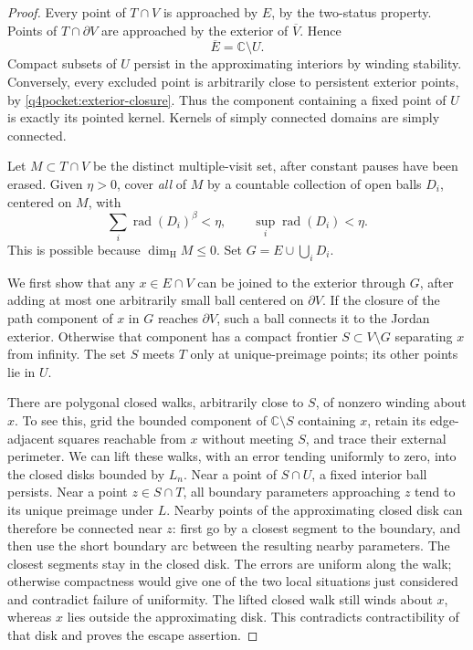 \begin{proof}
Every point of $T\cap V$ is approached by $E$, by the two-status
property.  Points of $T\cap\partial V$ are approached by the exterior
of $\overline V$.  Hence
\begin{equation}
 \overline E=\mathbb C\setminus U.
 \label{q4pocket:exterior-closure}
\end{equation}
Compact subsets of $U$ persist in the approximating interiors by
winding stability.  Conversely, every excluded point is arbitrarily
close to persistent exterior points, by
\eqref{q4pocket:exterior-closure}.  Thus the component containing a
fixed point of $U$ is exactly its pointed kernel.  Kernels of simply
connected domains are simply connected.

Let $M\subset T\cap V$ be the distinct multiple-visit set, after
constant pauses have been erased.  Given $\eta>0$, cover \emph{all}
of $M$ by a countable collection of open balls $D_i$, centered on
$M$, with
\[
 \sum_i\operatorname{rad}(D_i)^\beta<\eta,
 \qquad \sup_i\operatorname{rad}(D_i)<\eta.
\]
This is possible because $\dim_{\mathrm H}M\leq0$.  Set
$G=E\cup\bigcup_iD_i$.

We first show that any $x\in E\cap V$ can be joined to the exterior
through $G$, after adding at most one arbitrarily small ball centered
on $\partial V$.  If the closure of the path component of $x$ in
$G$ reaches $\partial V$, such a ball connects it to the Jordan
exterior.  Otherwise that component has a compact frontier
$S\subset V\setminus G$ separating $x$ from infinity.  The set
$S$ meets $T$ only at unique-preimage points; its other points lie
in $U$.

There are polygonal closed walks, arbitrarily close to $S$, of
nonzero winding about $x$.  To see this, grid the bounded component
of $\mathbb C\setminus S$ containing $x$, retain its edge-adjacent
squares reachable from $x$ without meeting $S$, and trace their
external perimeter.  We can lift these walks, with an error tending
uniformly to zero, into the closed disks bounded by $L_n$.  Near a
point of $S\cap U$, a fixed interior ball persists.  Near a point
$z\in S\cap T$, all boundary parameters approaching $z$ tend to
its unique preimage under $L$.  Nearby points of the approximating
closed disk can therefore be connected near $z$: first go by a
closest segment to the boundary, and then use the short boundary
arc between the resulting nearby parameters.  The closest segments
stay in the closed disk.  The errors are uniform along the walk;
otherwise compactness would give one of the two local situations
just considered and contradict failure of uniformity.  The lifted
closed walk still winds about $x$, whereas $x$ lies outside the
approximating disk.  This contradicts contractibility of that disk
and proves the escape assertion.


\end{proof}
